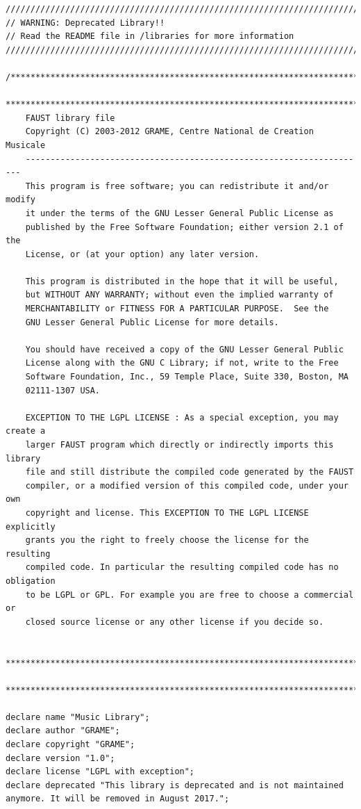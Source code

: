 \documentclass{article}
\begin{document}
\bigskip\bigskip
\begin{lstlisting}[caption=\texttt{music.lib}]
//////////////////////////////////////////////////////////////////////////////////////////
// WARNING: Deprecated Library!!
// Read the README file in /libraries for more information
//////////////////////////////////////////////////////////////////////////////////////////

/************************************************************************
 ************************************************************************
    FAUST library file
    Copyright (C) 2003-2012 GRAME, Centre National de Creation Musicale
    ---------------------------------------------------------------------
    This program is free software; you can redistribute it and/or modify
    it under the terms of the GNU Lesser General Public License as 
    published by the Free Software Foundation; either version 2.1 of the 
    License, or (at your option) any later version.

    This program is distributed in the hope that it will be useful,
    but WITHOUT ANY WARRANTY; without even the implied warranty of
    MERCHANTABILITY or FITNESS FOR A PARTICULAR PURPOSE.  See the
    GNU Lesser General Public License for more details.

    You should have received a copy of the GNU Lesser General Public
    License along with the GNU C Library; if not, write to the Free
    Software Foundation, Inc., 59 Temple Place, Suite 330, Boston, MA
    02111-1307 USA. 
        
    EXCEPTION TO THE LGPL LICENSE : As a special exception, you may create a
    larger FAUST program which directly or indirectly imports this library
    file and still distribute the compiled code generated by the FAUST
    compiler, or a modified version of this compiled code, under your own
    copyright and license. This EXCEPTION TO THE LGPL LICENSE explicitly
    grants you the right to freely choose the license for the resulting
    compiled code. In particular the resulting compiled code has no obligation
    to be LGPL or GPL. For example you are free to choose a commercial or
    closed source license or any other license if you decide so.

 ************************************************************************
 ************************************************************************/

declare name "Music Library";
declare author "GRAME";
declare copyright "GRAME";
declare version "1.0";
declare license "LGPL with exception";
declare deprecated "This library is deprecated and is not maintained anymore. It will be removed in August 2017."; 


\end{lstlisting}
\end{document}
